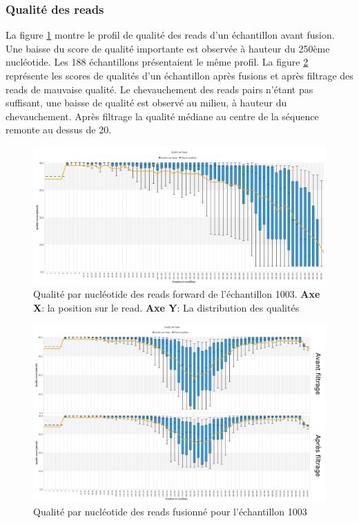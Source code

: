 \documentclass[12pt,a4paper]{article}
\begin{document}
\subsubsection{Qualité des reads}
La figure \ref{fastqt} montre le profil de qualité des reads d’un échantillon avant fusion. Une baisse du score de qualité importante est observée à hauteur du 250ème nucléotide. Les 188 échantillons présentaient le même profil.
La figure \ref{fastqt_after} représente les scores de qualités d’un échantillon après fusions et après filtrage des reads de mauvaise qualité. Le chevauchement des reads pairs n'étant pas suffisant, une baisse de qualité est observé au milieu, à hauteur du chevauchement. Après filtrage la qualité médiane au centre de la séquence remonte au dessus de 20.


\begin{figure}[ht]
\begin{center}
\includegraphics[scale=0.45]{img/1003_forward.png}\hfill
\end{center}
\caption{Qualité par nucléotide des reads forward de l'échantillon 1003. \textbf{Axe X}: la position sur le read. \textbf{Axe Y}: La distribution des qualités}
\label{fastqt}
\end{figure}


\begin{figure}[ht]
\begin{center}
\includegraphics[scale=0.45]{img/duo_merging.png}\hfill
\end{center}
\caption{Qualité par nucléotide des reads fusionné pour l'échantillon 1003}
\label{fastqt_after}
\end{figure}
\end{document}
